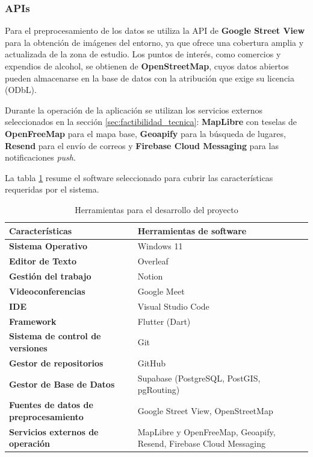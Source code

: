 \subsubsection{APIs}
Para el preprocesamiento de los datos se utiliza la API de \textbf{Google Street View} para la obtención de imágenes del entorno, ya que ofrece una cobertura amplia y actualizada de la zona de estudio. Los puntos de interés, como comercios y expendios de alcohol, se obtienen de \textbf{OpenStreetMap}, cuyos datos abiertos pueden almacenarse en la base de datos con la atribución que exige su licencia (ODbL).

Durante la operación de la aplicación se utilizan los servicios externos seleccionados en la sección \ref{sec:factibilidad_tecnica}: \textbf{MapLibre} con teselas de \textbf{OpenFreeMap} para el mapa base, \textbf{Geoapify} para la búsqueda de lugares, \textbf{Resend} para el envío de correos y \textbf{Firebase Cloud Messaging} para las notificaciones \textit{push}.

La tabla \ref{tab:herramientas_proyecto} resume el software seleccionado para cubrir las características requeridas por el sistema.

\begin{table}[htbp]
\centering
\caption{Herramientas para el desarrollo del proyecto}
\label{tab:herramientas_proyecto}
\begin{tabular}{| >{\centering\arraybackslash}m{6cm} | >{\centering\arraybackslash}p{6cm} |}
\hline
\textbf{Características} & \textbf{Herramientas de software} \\ \hline
\textbf{Sistema Operativo} & Windows 11 \\ \hline
\textbf{Editor de Texto} & Overleaf \\ \hline
\textbf{Gestión del trabajo} & Notion \\ \hline
\textbf{Videoconferencias} & Google Meet \\ \hline
\textbf{IDE} & Visual Studio Code \\ \hline
\textbf{Framework} & Flutter (Dart) \\ \hline
\textbf{Sistema de control de versiones} & Git \\ \hline
\textbf{Gestor de repositorios} & GitHub \\ \hline
\textbf{Gestor de Base de Datos} & Supabase (PostgreSQL, PostGIS, pgRouting) \\ \hline
\textbf{Fuentes de datos de preprocesamiento} & Google Street View, OpenStreetMap \\ \hline
\textbf{Servicios externos de operación} & MapLibre y OpenFreeMap, Geoapify, Resend, Firebase Cloud Messaging \\ \hline
\end{tabular}
\end{table}